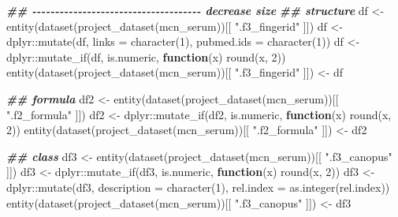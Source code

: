\documentclass[
]{article}
\newenvironment{Shaded}{\begin{snugshade}}{\end{snugshade}}
\newcommand{\AttributeTok}[1]{\textcolor[rgb]{0.77,0.63,0.00}{#1}}
\newcommand{\ControlFlowTok}[1]{\textcolor[rgb]{0.13,0.29,0.53}{\textbf{#1}}}
\newcommand{\DecValTok}[1]{\textcolor[rgb]{0.00,0.00,0.81}{#1}}
\newcommand{\DocumentationTok}[1]{\textcolor[rgb]{0.56,0.35,0.01}{\textbf{\textit{#1}}}}
\newcommand{\FunctionTok}[1]{\textcolor[rgb]{0.00,0.00,0.00}{#1}}
\newcommand{\NormalTok}[1]{#1}
\newcommand{\OtherTok}[1]{\textcolor[rgb]{0.56,0.35,0.01}{#1}}
\newcommand{\SpecialCharTok}[1]{\textcolor[rgb]{0.00,0.00,0.00}{#1}}
\newcommand{\StringTok}[1]{\textcolor[rgb]{0.31,0.60,0.02}{#1}}
\begin{document}
\begin{Shaded}
\begin{Highlighting}[]
\DocumentationTok{\#\# {-}{-}{-}{-}{-}{-}{-}{-}{-}{-}{-}{-}{-}{-}{-}{-}{-}{-}{-}{-}{-}{-}{-}{-}{-}{-}{-}{-}{-}{-}{-}{-}{-}{-}{-}{-}{-} decrease size}
\DocumentationTok{\#\# structure}
\NormalTok{df }\OtherTok{\textless{}{-}} \FunctionTok{entity}\NormalTok{(}\FunctionTok{dataset}\NormalTok{(}\FunctionTok{project\_dataset}\NormalTok{(mcn\_serum))[[ }\StringTok{".f3\_fingerid"}\NormalTok{ ]])}
\NormalTok{df }\OtherTok{\textless{}{-}}\NormalTok{ dplyr}\SpecialCharTok{::}\FunctionTok{mutate}\NormalTok{(df, }\AttributeTok{links =} \FunctionTok{character}\NormalTok{(}\DecValTok{1}\NormalTok{), }\AttributeTok{pubmed.ids =} \FunctionTok{character}\NormalTok{(}\DecValTok{1}\NormalTok{))}
\NormalTok{df }\OtherTok{\textless{}{-}}\NormalTok{ dplyr}\SpecialCharTok{::}\FunctionTok{mutate\_if}\NormalTok{(df, is.numeric, }\ControlFlowTok{function}\NormalTok{(x) }\FunctionTok{round}\NormalTok{(x, }\DecValTok{2}\NormalTok{))}
\FunctionTok{entity}\NormalTok{(}\FunctionTok{dataset}\NormalTok{(}\FunctionTok{project\_dataset}\NormalTok{(mcn\_serum))[[ }\StringTok{".f3\_fingerid"}\NormalTok{ ]]) }\OtherTok{\textless{}{-}}\NormalTok{ df}

\DocumentationTok{\#\# formula}
\NormalTok{df2 }\OtherTok{\textless{}{-}} \FunctionTok{entity}\NormalTok{(}\FunctionTok{dataset}\NormalTok{(}\FunctionTok{project\_dataset}\NormalTok{(mcn\_serum))[[ }\StringTok{".f2\_formula"}\NormalTok{ ]])}
\NormalTok{df2 }\OtherTok{\textless{}{-}}\NormalTok{ dplyr}\SpecialCharTok{::}\FunctionTok{mutate\_if}\NormalTok{(df2, is.numeric, }\ControlFlowTok{function}\NormalTok{(x) }\FunctionTok{round}\NormalTok{(x, }\DecValTok{2}\NormalTok{))}
\FunctionTok{entity}\NormalTok{(}\FunctionTok{dataset}\NormalTok{(}\FunctionTok{project\_dataset}\NormalTok{(mcn\_serum))[[ }\StringTok{".f2\_formula"}\NormalTok{ ]]) }\OtherTok{\textless{}{-}}\NormalTok{ df2}

\DocumentationTok{\#\# class}
\NormalTok{df3 }\OtherTok{\textless{}{-}} \FunctionTok{entity}\NormalTok{(}\FunctionTok{dataset}\NormalTok{(}\FunctionTok{project\_dataset}\NormalTok{(mcn\_serum))[[ }\StringTok{".f3\_canopus"}\NormalTok{ ]])}
\NormalTok{df3 }\OtherTok{\textless{}{-}}\NormalTok{ dplyr}\SpecialCharTok{::}\FunctionTok{mutate\_if}\NormalTok{(df3, is.numeric, }\ControlFlowTok{function}\NormalTok{(x) }\FunctionTok{round}\NormalTok{(x, }\DecValTok{2}\NormalTok{))}
\NormalTok{df3 }\OtherTok{\textless{}{-}}\NormalTok{ dplyr}\SpecialCharTok{::}\FunctionTok{mutate}\NormalTok{(df3, }\AttributeTok{description =} \FunctionTok{character}\NormalTok{(}\DecValTok{1}\NormalTok{),}
                     \AttributeTok{rel.index =} \FunctionTok{as.integer}\NormalTok{(rel.index))}
\FunctionTok{entity}\NormalTok{(}\FunctionTok{dataset}\NormalTok{(}\FunctionTok{project\_dataset}\NormalTok{(mcn\_serum))[[ }\StringTok{".f3\_canopus"}\NormalTok{ ]]) }\OtherTok{\textless{}{-}}\NormalTok{ df3}


\end{Highlighting}
\end{Shaded}
\end{document}
